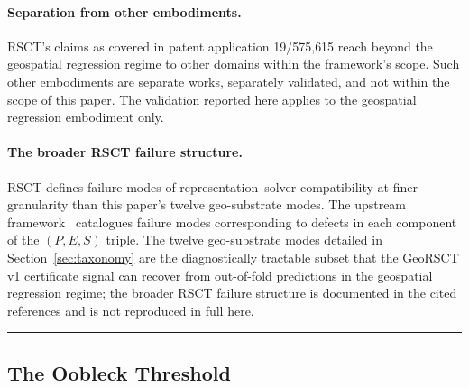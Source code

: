 \documentclass{article}
\begin{document}
\paragraph{Separation from other embodiments.}
RSCT's claims as covered in patent application 19/575{,}615 reach beyond the geospatial regression regime to other domains within the framework's scope. Such other embodiments are separate works, separately validated, and not within the scope of this paper. The validation reported here applies to the geospatial regression embodiment only.

\paragraph{The broader RSCT failure structure.}
RSCT defines failure modes of representation--solver compatibility at finer granularity than this paper's twelve geo-substrate modes. The upstream framework~\citep{martin2026rsct} catalogues failure modes corresponding to defects in each component of the $(P, E, S)$ triple. The twelve geo-substrate modes detailed in Section~\ref{sec:taxonomy} are the diagnostically tractable subset that the GeoRSCT v1 certificate signal can recover from out-of-fold predictions in the geospatial regression regime; the broader RSCT failure structure is documented in the cited references and is not reproduced in full here.

\noindent\rule{\textwidth}{0.8pt}

\subsection{The Oobleck Threshold}
\end{document}
